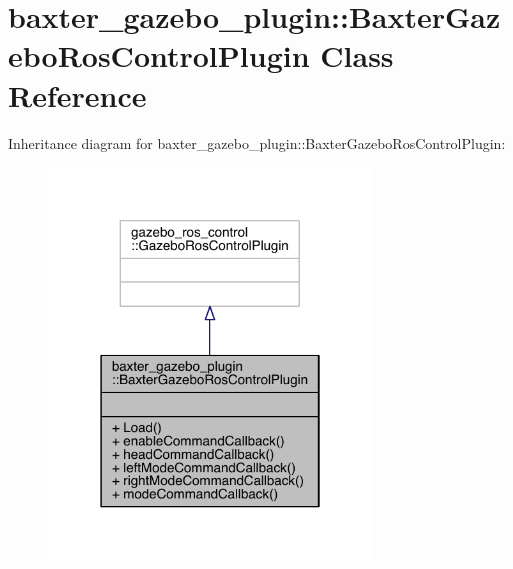 \hypertarget{classbaxter__gazebo__plugin_1_1_baxter_gazebo_ros_control_plugin}{}\section{baxter\+\_\+gazebo\+\_\+plugin\+:\+:Baxter\+Gazebo\+Ros\+Control\+Plugin Class Reference}
\label{classbaxter__gazebo__plugin_1_1_baxter_gazebo_ros_control_plugin}


Inheritance diagram for baxter\+\_\+gazebo\+\_\+plugin\+:\+:Baxter\+Gazebo\+Ros\+Control\+Plugin\+:\nopagebreak
\begin{figure}[H]
\begin{center}
\leavevmode
\includegraphics[width=243pt]{classbaxter__gazebo__plugin_1_1_baxter_gazebo_ros_control_plugin__inherit__graph}
\end{center}
\end{figure}


